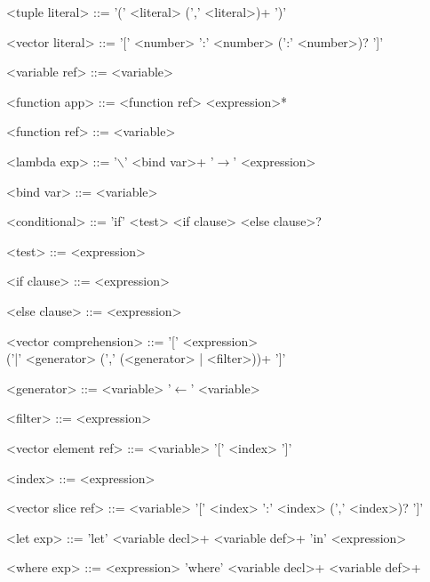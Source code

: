\begin{grammar}
<tuple literal>  ::=    '(' <literal> (',' <literal>)+ ')'

<vector literal> ::=    '[' <number> ':' <number> (':' <number>)? ']'

<variable ref>   ::=    <variable>

<function app>   ::=    <function ref> <expression>*

<function ref>   ::=    <variable>

<lambda exp>     ::=    '$\backslash$' <bind var>+ '$\to$' <expression>

<bind var>       ::=    <variable>

<conditional>    ::=    'if' <test> <if clause> <else clause>?

<test>           ::=    <expression>

<if clause>      ::=    <expression>

<else clause>    ::=    <expression>

<vector comprehension>
                 ::=    '[' <expression> \\('|' <generator> (',' (<generator> | <filter>))+ ']'

<generator>      ::=    <variable> '$\gets$' <variable>

<filter>         ::=    <expression>

<vector element ref>
                 ::=    <variable> '[' <index> ']'

<index>          ::=    <expression>

<vector slice ref>
                 ::=    <variable> '[' <index> ':' <index> (',' <index>)? ']'

<let exp>        ::=    'let' <variable decl>+ <variable def>+ 'in' <expression>

<where exp>      ::=    <expression> 'where' <variable decl>+ <variable def>+
\end{grammar}

